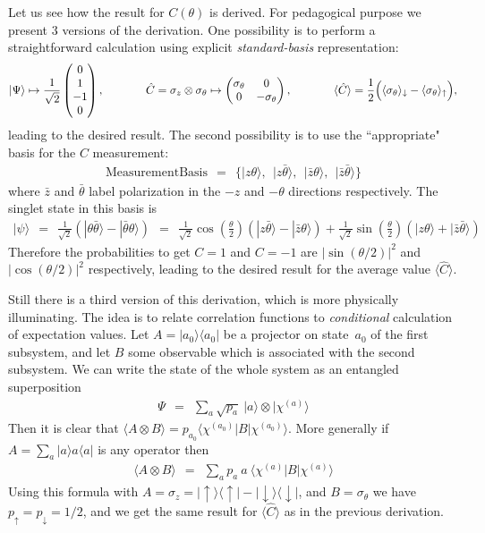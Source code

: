 \documentclass[onecolumn,fleqn, 11pt]{revtex4}
\newcommand{\amatrix}[1]{\begin{matrix} #1 \end{matrix}}
\newcommand{\beq}{\begin{eqnarray}}
\newcommand{\eeq}{\end{eqnarray}}
\begin{document}
Let us see how the result for ${C(\theta)}$ is derived. 
For pedagogical purpose we present 3 versions of the 
derivation. One possibility  is to perform a straightforward 
calculation using explicit {\em standard-basis} representation:        
\beq
|\Psi\rangle  \mapsto \frac{1}{\sqrt{2}}\left(\amatrix{0 \cr 1 \cr -1 \cr 0}\right),
\ \ \ \ \ \ \ \ \ \ \     
\hat{C} = \sigma_z \otimes \sigma_{\theta} 
\mapsto \left(\amatrix{ \sigma_{\theta} & 0 \cr 0 & -\sigma_{\theta} }\right),
\ \ \ \ \ \ \ \ \ \ \  
\langle \hat{C}\rangle = \frac{1}{2}\Big(\langle\sigma_{\theta}\rangle_{\downarrow}-\langle\sigma_{\theta}\rangle_{\uparrow}\Big), 
\eeq
leading to the desired result. The second possibility
is to use the ``appropriate" basis for the $C$ measurement:
\beq
\text{MeasurementBasis} \ \ = \ \ 
\Big\{ 
|z \theta\rangle, \ \ 
|z \bar{\theta}\rangle, \ \ 
|\bar{z} \theta\rangle, \ \ 
|\bar{z} \bar{\theta}\rangle
\Big\} 
\eeq
where $\bar{z}$ and $\bar{\theta}$ label polarization 
in the $-z$ and $-\theta$ directions respectively.
The singlet state in this basis is 
\beq 
|\psi \rangle 
\ \ = \ \ \frac{1}{\sqrt{2}} \left( |\theta\bar{\theta}\rangle-|\bar{\theta}\theta\rangle \right) 
\ \ = \ \ 
\frac{1}{\sqrt{2}}\cos\left(\frac{\theta}{2}\right) \left( |z \bar{\theta}\rangle - |\bar{z}\theta\rangle \right) 
+\frac{1}{\sqrt{2}}\sin\left(\frac{\theta}{2}\right) \left( |z \theta\rangle + |\bar{z}\bar{\theta}\rangle \right)
\eeq
Therefore the probabilities to get $C{=}1$ and $C{=}-1$ 
are $|\sin(\theta/2)|^2$ and $|\cos(\theta/2)|^2$ respectively, 
leading to the desired result for the average value $\langle \hat{C}\rangle$.

Still there is a third version of this derivation, which is more physically 
illuminating. The idea is to relate correlation functions to {\em conditional} calculation 
of expectation values. Let ${A=|a_0\rangle\langle a_0|}$ be a projector 
on state~$a_0$ of the first subsystem, and let $B$ some 
observable which is associated with the second subsystem. 
We can write the state of the whole system as an entangled superposition
\beq
\Psi \ \ = \ \ \sum_a \sqrt{p_a}\ |a \rangle \otimes |\chi^{(a)}\rangle
\eeq
Then it is clear that ${\langle A\otimes B \rangle = p_{a_0} \langle \chi^{(a_0)} |B| \chi^{(a_0)} \rangle}$. 
More generally if ${A=\sum_a |a\rangle a \langle a|}$ is any operator then 
\beq
\langle A\otimes B \rangle \ \ = \ \ \sum_a p_{a} \ a \ \langle \chi^{(a)} |B| \chi^{(a)} \rangle
\eeq
Using this formula 
with $A=\sigma_z=|\uparrow\rangle\langle \uparrow|-|\downarrow\rangle\langle \downarrow|$,  
and $B=\sigma_{\theta}$ we have ${p_{\uparrow}=p_{\downarrow}=1/2}$, 
and we get the same result for $\langle \hat{C}\rangle$ as in the previous derivation.  
 
\end{document}
